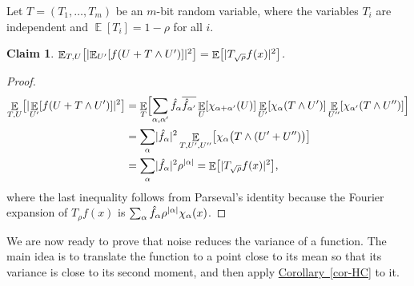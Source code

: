 \documentclass[11pt]{article}
\numberwithin{equation}{section}
\newtheorem{claim}[theorem]{Claim}
\theoremstyle{definition}
\theoremstyle{plain}
\newcommand{\expref}[2]{\hyperref[#2]{#1~\ref{#2}}}
\def\hf{\hat f}
\DeclarePairedDelimiter{\abs}{\lvert}{\rvert}
\DeclareMathOperator*{\E}{\mathbb{E}}                 %
\begin{document}
  Let $T = (T_1, \ldots, T_m)$ be an  %
  $m$-bit  %
 random variable,  %
  where the variables $T_i$ are independent and $\E[T_i]=1-\rho$ for all $i$.
  \begin{claim} \label{claim:decouple-noise}
    $\E_{T,U} \bigl[ \abs{\E_{U'}[f(U + T \wedge U')]}^2 \bigr] = \E \bigl[ \abs{T_{\sqrt{\rho}}f(x)}^2 \bigr]$.
  \end{claim}
  \begin{proof}
    \begin{align*}
      \E_{T,U} \bigl[ \abs{\E_{U'}[f(U + T \wedge U')]}^2 \bigr]
      &= \E_T \Bigl[ \sum_{\alpha,\alpha'} \hf_{\alpha} \overline{\hf_{\alpha'}} \E_U[\chi_{\alpha + \alpha'}(U)] \E_{U'}[\chi_\alpha(T \wedge U')] \E_{U''}[\chi_{\alpha'}(T \wedge U'')] \Bigr] \\
      &= \sum_{\alpha} \abs{\hf_{\alpha}}^2 \E_{T,U',U''} \bigl[\chi_\alpha \bigl(T \wedge (U' + U'') \bigr) \bigr] \\
      &= \sum_{\alpha} \abs{\hf_{\alpha}}^2 \rho^{\abs{\alpha}} 
      = \E \bigl[ \abs{T_{\sqrt{\rho}}f(x)}^2 \bigr] ,
    \end{align*}
    where the last inequality follows from Parseval's identity because the Fourier expansion of $T_\rho f(x)$ is $\sum_\alpha \hf_\alpha \rho^{\abs{\alpha}} \chi_\alpha(x)$.
  \end{proof}

  We are now ready to prove that noise reduces the variance of a function.
  The main idea is to translate the function to a point close to its mean so that its variance is close to its second moment, and then apply \expref{Corollary}{cor-HC} to it.
\end{document}
